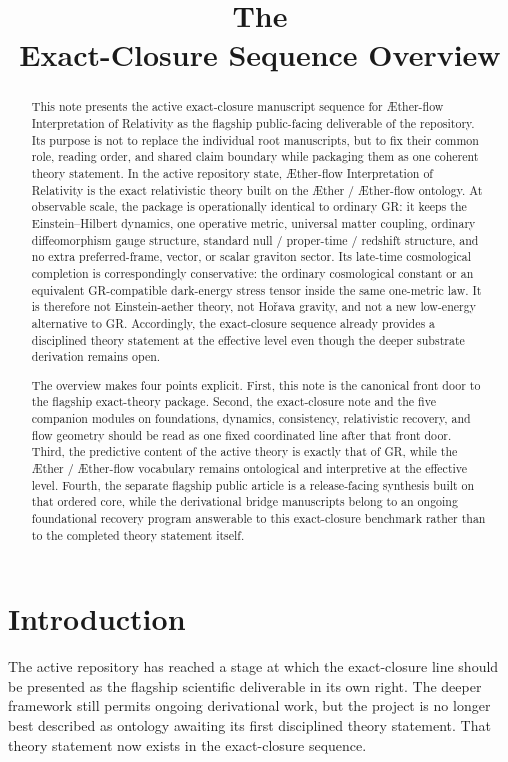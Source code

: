 \documentclass[11pt]{article}
\title{\textbf{The \TheoryName{}}\\[0.4em]
\large Exact-Closure Sequence Overview}
\author{}
\date{}
\newcommand{\Aether}{\AE{}ther}
\newcommand{\Aflow}{\AE{}ther-flow}
\newcommand{\TheoryName}{\Aflow{} Interpretation of Relativity}
\begin{document}
\AetherFlowAPATitlePage

\begin{abstract}
This note presents the active exact-closure manuscript sequence for \TheoryName{} as the flagship public-facing deliverable of the repository. Its purpose is not to replace the individual root manuscripts, but to fix their common role, reading order, and shared claim boundary while packaging them as one coherent theory statement. In the active repository state, \TheoryName{} is the exact relativistic theory built on the \Aether{} / \Aflow{} ontology. At observable scale, the package is operationally identical to ordinary GR: it keeps the Einstein--Hilbert dynamics, one operative metric, universal matter coupling, ordinary diffeomorphism gauge structure, standard null / proper-time / redshift structure, and no extra preferred-frame, vector, or scalar graviton sector. Its late-time cosmological completion is correspondingly conservative: the ordinary cosmological constant or an equivalent GR-compatible dark-energy stress tensor inside the same one-metric law. It is therefore not Einstein-aether theory, not Ho\v{r}ava gravity, and not a new low-energy alternative to GR. Accordingly, the exact-closure sequence already provides a disciplined theory statement at the effective level even though the deeper substrate derivation remains open.

The overview makes four points explicit. First, this note is the canonical front door to the flagship exact-theory package. Second, the exact-closure note and the five companion modules on foundations, dynamics, consistency, relativistic recovery, and flow geometry should be read as one fixed coordinated line after that front door. Third, the predictive content of the active theory is exactly that of GR, while the \Aether{} / \Aflow{} vocabulary remains ontological and interpretive at the effective level. Fourth, the separate flagship public article is a release-facing synthesis built on that ordered core, while the derivational bridge manuscripts belong to an ongoing foundational recovery program answerable to this exact-closure benchmark rather than to the completed theory statement itself.
\end{abstract}

\section{Introduction}

The active repository has reached a stage at which the exact-closure line should be presented as the flagship scientific deliverable in its own right. The deeper framework still permits ongoing derivational work, but the project is no longer best described as ontology awaiting its first disciplined theory statement. That theory statement now exists in the exact-closure sequence.
\end{document}
